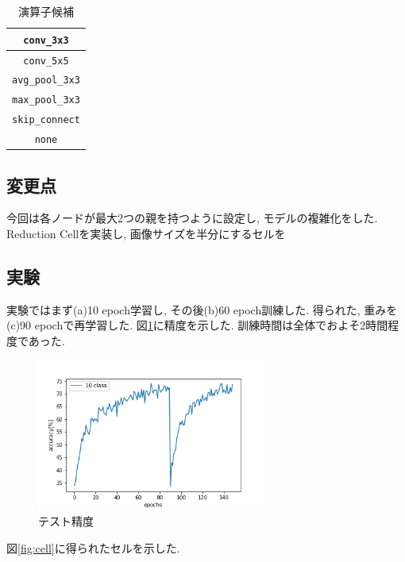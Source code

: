 \documentclass[twocolumn]{jarticle}     %
\begin{document}
\begin{table}[tb]
  \begin{center}
    \caption{演算子候補}
    \begin{tabular}{|c|} \hline
      \verb|conv_3x3| \\ \hline
      \verb|conv_5x5| \\ \hline
      \verb|avg_pool_3x3| \\ \hline
      \verb|max_pool_3x3| \\ \hline
      \verb|skip_connect| \\ \hline
      \verb|none| \\ \hline
    \end{tabular}
    \label{tab:ops}
  \end{center}
\end{table}

\subsection{変更点}
今回は各ノードが最大2つの親を持つように設定し, モデルの複雑化をした.
Reduction Cellを実装し, 画像サイズを半分にするセルを

\subsection{実験}
実験ではまず(a)10 epoch学習し,
その後(b)60 epoch訓練した.
得られた, 重みを(c)90 epochで再学習した.
図\ref{fig:acc}に精度を示した.
訓練時間は全体でおよそ2時間程度であった.

\begin{figure}[tb]
	\begin{center}
		\includegraphics[clip,width=7.5cm]{accuracy.png}
		\caption{テスト精度}
		\label{fig:acc}
	\end{center}
\end{figure}

図\ref{fig:cell}に得られたセルを示した.
\end{document}
